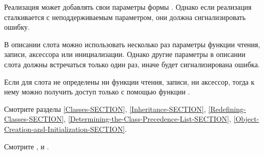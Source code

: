 \begin{defmac}
Реализация может добавлять свои параметры формы .
Однако если реализация сталкивается с неподдерживаемым параметром, они должна
сигнализировать ошибку.

В описании слота можно использовать несколько раз параметры функции чтения,
записи, аксессора или инициализации. Однако другие параметры в описании слота
должны встречаться только один раз, иначе будет сигнализирована ошибка.

Если для слота не определены ни функции чтения, записи, ни аксессор, тогда к
нему можно получить доступ только с помощью функции .

Смотрите разделы \ref{Classes-SECTION},
\ref{Inheritance-SECTION},
\ref{Redefining-Classes-SECTION},
\ref{Determining-the-Class-Precedence-List-SECTION},
\ref{Object-Creation-and-Initialization-SECTION}.

Смотрите ,
 и 
.
\end{defmac}

